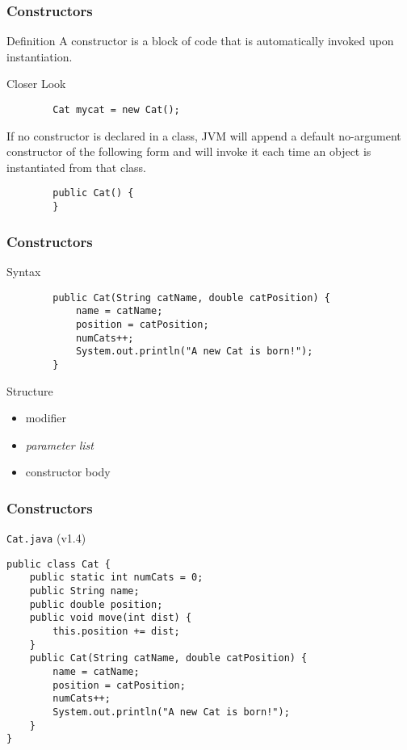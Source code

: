 \documentclass[10pt, compress]{beamer}
\begin{document}
\begin{frame}[fragile]
	\frametitle{Constructors}
	\begin{block}{Definition}
		A constructor is a block of code that is automatically invoked upon instantiation.
	\end{block}
	\begin{block}{Closer Look}
		\begin{verbatim}
		Cat mycat = new Cat();
		\end{verbatim}
		If no constructor is declared in a class, JVM will append a default no-argument constructor of the following form and will invoke it each time an object is instantiated from that class.
		\begin{verbatim}
		public Cat() {
		}
		\end{verbatim}
	\end{block}
\end{frame}

\begin{frame}[fragile]
	\frametitle{Constructors}
	\begin{block}{Syntax}
		\begin{verbatim}
		public Cat(String catName, double catPosition) {
			name = catName;
			position = catPosition;
			numCats++;
			System.out.println("A new Cat is born!");
		}
		\end{verbatim}
	\end{block}
	\begin{block}{Structure}
	\begin{itemize}
		\item[] modifier
		\item[] \emph{parameter list}
		\item[] constructor body
	\end{itemize}
	\end{block}
\end{frame}

\begin{frame}[fragile]
	\frametitle{Constructors}
	\begin{block}{\texttt{Cat.java} (v1.4)}
		\begin{verbatim}
public class Cat {
	public static int numCats = 0;
	public String name;
	public double position;
	public void move(int dist) {
		this.position += dist;
	}
	public Cat(String catName, double catPosition) {
		name = catName;
		position = catPosition;
		numCats++;
		System.out.println("A new Cat is born!");
	}
}
		\end{verbatim}
	\end{block}
\end{frame}
\end{document}
